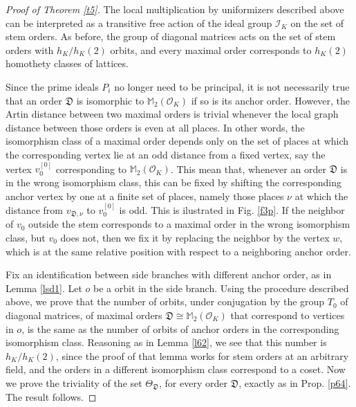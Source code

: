\documentclass{article}
\theoremstyle{definition}
\theoremstyle{remark}
\begin{document}
\begin{proof}[Proof of Theorem \ref{t5}]
The local multiplication by
uniformizers described above
can be interpreted as a transitive
free action of the ideal group
$\mathcal{I}_K$ on the set
of stem orders. 
As before, the group of diagonal matrices acts on the set
of stem orders with $h_K/h_K(2)$ orbits, and every
maximal order corresponds to $h_K(2)$ homothety classes
of lattices. 

Since the prime ideals $P_i$ no longer need to
be principal, it is not necessarily true that an order
$\mathfrak{D}$ is isomorphic to $\mathbb{M}_2(\mathcal{O}_K)$
if so is its anchor order. However, the Artin distance 
 between two maximal orders is trivial
whenever the local graph distance between those orders
is even at all places. 
In other words, the isomorphism class of a maximal order
depends only on the set
of places at which the corresponding vertex lie at an
odd distance from a fixed vertex,
say the vertex $v_0^{[0]}$
corresponding to $\mathbb{M}_2(\mathcal{O}_K)$.
This mean that, whenever an order 
$\mathfrak{D}$ is in the wrong isomorphism class, 
this can be fixed by shifting the corresponding anchor vertex 
by one at a finite set of places, namely those places $\nu$ at
which the distance from $v_{\mathfrak{D},\nu}$ to $v_0^{[0]}$ 
is odd.
This is ilustrated in Fig. \ref{f3p}. If the neighbor of
$v_0$ outside the stem corresponds
to a maximal order in the wrong
isomorphism class, but $v_0$ does not, then we fix it by 
replacing the neighbor by the vertex $w$, which is at the 
same relative position with respect to a 
neighboring anchor order.

Fix an identification between side branches with different
anchor order, as in Lemma \ref{lsd1}.
Let $o$ be a orbit in the side branch.
Using the procedure described above, we prove that 
the number of orbits, under conjugation by the group 
$T_0$ of diagonal matrices, of maximal orders 
$\mathfrak{D}\cong\mathbb{M}_2(\mathcal{O}_K)$
that correspond to vertices in $o$, is the same 
as the number of orbits of anchor orders in the 
corresponding isomorphism class.
Reasoning as in Lemma \ref{l62}, we see that this 
number is $h_K/h_K(2)$, since the proof of that 
lemma works for stem orders
at an arbitrary field, and the orders in a 
different isomorphism class correspond to a coset. 
Now we prove the triviality of the
set $\Theta_{\mathfrak{D}}$, for every order $\mathfrak{D}$,
exactly as in Prop. \ref{p64}. The result follows.
\end{proof}
\end{document}
